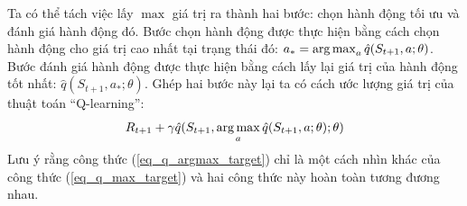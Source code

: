 	Ta có thể tách việc lấy $\max$ giá trị ra thành hai bước: chọn hành động tối ưu và đánh giá hành động đó.
	Bước chọn hành động được thực hiện bằng cách chọn hành động cho giá trị cao nhất tại trạng thái đó: $a_{*} = \operatorname*{arg\,max}_{a}\hat{q}(S_{t+1}, a;\theta)$.
	Bước đánh giá hành động được thực hiện bằng cách lấy lại giá trị của hành động tốt nhất: $\hat{q}(S_{t+1}, a_{*};\theta)$.
	Ghép hai bước này lại ta có cách ước lượng giá trị của thuật toán ``Q-learning'':
	\begin{equation}
		\label{eq_q_argmax_target}
		R_{t+1} + \gamma \hat{q}(S_{t+1}, \operatorname*{arg\,max}_{a}\hat{q}(S_{t+1}, a;\theta); \theta)
	\end{equation}
	Lưu ý rằng công thức (\ref{eq_q_argmax_target}) chỉ là một cách nhìn khác của công thức (\ref{eq_q_max_target}) và hai công thức này hoàn toàn tương đương nhau.
	
